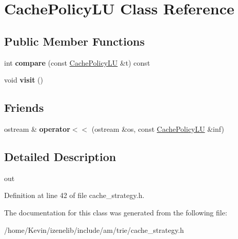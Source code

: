 \hypertarget{classCachePolicyLU}{
\section{CachePolicyLU Class Reference}
\label{classCachePolicyLU}
}
\subsection*{Public Member Functions}
\begin{CompactItemize}
\item 
\hypertarget{classCachePolicyLU_57ff375ccc7621eacbda3eb7502d62d1}{
int \textbf{compare} (const \hyperlink{classCachePolicyLU}{CachePolicyLU} \&t) const }
\label{classCachePolicyLU_57ff375ccc7621eacbda3eb7502d62d1}

\item 
\hypertarget{classCachePolicyLU_6bdbaedc8853de0830de0945dde4ab53}{
void \textbf{visit} ()}
\label{classCachePolicyLU_6bdbaedc8853de0830de0945dde4ab53}

\end{CompactItemize}
\subsection*{Friends}
\begin{CompactItemize}
\item 
\hypertarget{classCachePolicyLU_217844276d6e8d900f86878f325189c6}{
ostream \& \textbf{operator$<$$<$} (ostream \&os, const \hyperlink{classCachePolicyLU}{CachePolicyLU} \&inf)}
\label{classCachePolicyLU_217844276d6e8d900f86878f325189c6}

\end{CompactItemize}


\subsection{Detailed Description}
out 

Definition at line 42 of file cache\_\-strategy.h.

The documentation for this class was generated from the following file:\begin{CompactItemize}
\item 
/home/Kevin/izenelib/include/am/trie/cache\_\-strategy.h\end{CompactItemize}
